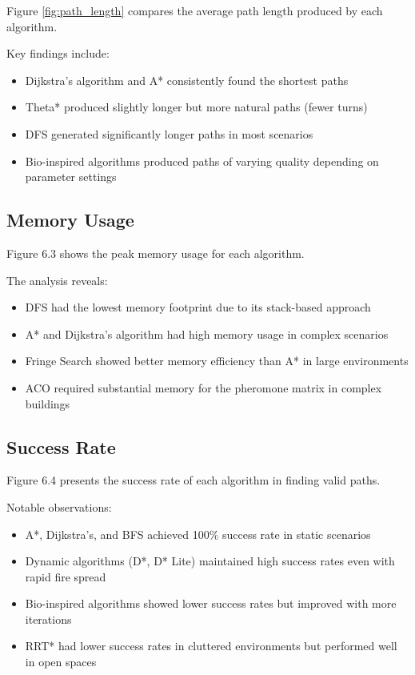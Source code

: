 \documentclass[11pt,a4paper]{report}
\begin{document}
Figure \ref{fig:path_length} compares the average path length produced by each algorithm.

Key findings include:
\begin{itemize}
    \item Dijkstra's algorithm and A* consistently found the shortest paths
    \item Theta* produced slightly longer but more natural paths (fewer turns)
    \item DFS generated significantly longer paths in most scenarios
    \item Bio-inspired algorithms produced paths of varying quality depending on parameter settings
\end{itemize}

\subsection{Memory Usage}
Figure 6.3 shows the peak memory usage for each algorithm.

The analysis reveals:
\begin{itemize}
    \item DFS had the lowest memory footprint due to its stack-based approach
    \item A* and Dijkstra's algorithm had high memory usage in complex scenarios
    \item Fringe Search showed better memory efficiency than A* in large environments
    \item ACO required substantial memory for the pheromone matrix in complex buildings
\end{itemize}

\subsection{Success Rate}
Figure 6.4 presents the success rate of each algorithm in finding valid paths.

Notable observations:
\begin{itemize}
    \item A*, Dijkstra's, and BFS achieved 100\% success rate in static scenarios
    \item Dynamic algorithms (D*, D* Lite) maintained high success rates even with rapid fire spread
    \item Bio-inspired algorithms showed lower success rates but improved with more iterations
    \item RRT* had lower success rates in cluttered environments but performed well in open spaces
\end{itemize}
\end{document}
